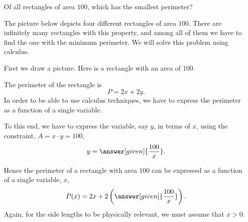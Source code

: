 \documentclass{ximera}
\begin{document}
\begin{example}
  Of all rectangles of area $100$, which has the smallest
  perimeter?
  \begin{explanation}
  The picture below depicts four different rectangles of area $100$. There are infinitely many rectangles with this property, and among all of them we have to find the one with the minimum perimeter.
 We will solve this problem using calculus. 
  \begin{image}
\end{image}

  First we draw a picture. Here is a rectangle with an area of $100$.
\begin{image}
\end{image}
 The perimeter of the rectangle  is 
  \[
    P = 2x+2y.
    \]
   In order to be able to use  calculus techniques,  we have to express the perimeter as a function of a single variable.
   
   To this end, we have to  express the variable, say $y$, in terms of $x$, using the constraint, $A=x\cdot y=100$,
\[
     y=\answer[given]{\frac{100}{x}}.
     \]
     
    Hence the perimeter of a rectangle with area $100$ can be expressed as a function of a single variable, $x$,
    \[
    P(x) = 2x+2\left(\answer[given]{\frac{100}{x}}\right).
    \]
    Again, for the side lengths to be physically relevant, we must
    assume that $x>0$.
    

\end{explanation}
\end{example}
\end{document}
